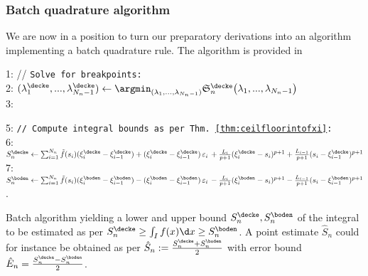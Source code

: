 \subsubsection{Batch quadrature algorithm}
We are now in a position to turn our preparatory derivations into an algorithm implementing a batch quadrature rule. 
The algorithm is provided in 
\begin{algorithm} 
\label{alg:batchhoelderquad1}
\begin{small}
%
\BlankLine
1: // \texttt{Solve for breakpoints: } \\
2: $ (\lambda_1^\decke,...,\lambda_{{N_n}-1}^\decke) \leftarrow \argmin_{(\lambda_1,...,\lambda_{{N_n}-1})} \mathfrak S^\decke_n\bigl(\lambda_1,...,\lambda_{{N_n}-1}\bigr)$\\

3: 

5:  \texttt{// Compute integral bounds as per Thm. \ref{thm:ceilfloorintofxi}:}\\
6: $S^\decke_n \leftarrow \sum_{i=1}^{N_n}  \tilde f(s_i) (\xi_{i}^\decke - \xi_{i-1}^\decke) +  (\xi_{i}^\decke - \xi_{i-1}^\decke)\, \varepsilon_i \,+ \frac{L_i}{{p+1}} (\xi_{i}^\decke-s_i )^{p+1}+  \frac{L_{i-1}}{{p+1}}(s_i-\xi_{i-1}^\decke)^{p+1} $\\	 
7: $S^\boden_n \leftarrow \sum_{i=1}^{N_n}  \tilde f(s_i) (\xi_{i}^\boden - \xi_{i-1}^\boden) - (\xi_i^\boden - \xi_{i-1}^\boden)\, \varepsilon_i \,- \frac{L_i}{{p+1}} (\xi_i^\boden-s_i )^{p+1} - \frac{L_{i-1}}{{p+1}}(s_i-\xi_{i-1}^\boden)^{p+1}   $.
\BlankLine
\caption{Batch algorithm yielding a lower and upper bound $S^\decke_n, S^\boden_n $ of the integral to be estimated as per $S^\decke_n \geq \int_I f(x) \d x \geq S^\boden_n $. A point estimate $\hat S_n$ could for instance be obtained as per $\hat S_n := \frac{S^\decke_n + S^\boden_n}{2} $ with error bound $\hat E_n = \frac{S^\decke_n - S^\boden_n}{2}$.}

\end{small}
\end{algorithm}


